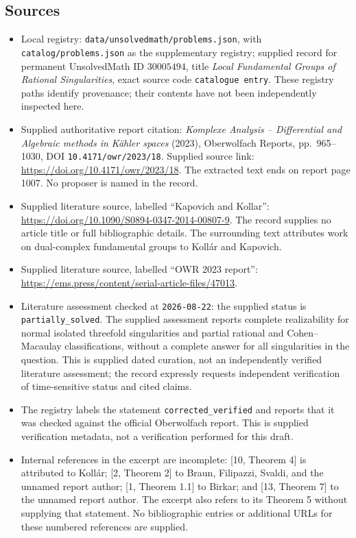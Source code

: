 \documentclass[11pt]{article}
\begin{document}
\subsection{Sources}
\begin{itemize}
\item Local registry: \texttt{data/unsolvedmath/problems.json}, with \texttt{catalog/problems.json} as the supplementary registry; supplied record for permanent UnsolvedMath ID \(30005494\), title \emph{Local Fundamental Groups of Rational Singularities}, exact source code \texttt{catalogue entry}. These registry paths identify provenance; their contents have not been independently inspected here.
\item Supplied authoritative report citation: \emph{Komplexe Analysis -- Differential and Algebraic methods in Kähler spaces} (2023), Oberwolfach Reports, pp.\ 965--1030, DOI \texttt{10.4171/owr/2023/18}. Supplied source link: \url{https://doi.org/10.4171/owr/2023/18}. The extracted text ends on report page 1007. No proposer is named in the record.
\item Supplied literature source, labelled ``Kapovich and Kollar'': \url{https://doi.org/10.1090/S0894-0347-2014-00807-9}. The record supplies no article title or full bibliographic details. The surrounding text attributes work on dual-complex fundamental groups to Koll\'ar and Kapovich.
\item Supplied literature source, labelled ``OWR 2023 report'': \url{https://ems.press/content/serial-article-files/47013}.
\item Literature assessment checked at \texttt{2026-08-22}: the supplied status is \texttt{partially\_solved}. The supplied assessment reports complete realizability for normal isolated threefold singularities and partial rational and Cohen--Macaulay classifications, without a complete answer for all singularities in the question. This is supplied dated curation, not an independently verified literature assessment; the record expressly requests independent verification of time-sensitive status and cited claims.
\item The registry labels the statement \texttt{corrected\_verified} and reports that it was checked against the official Oberwolfach report. This is supplied verification metadata, not a verification performed for this draft.
\item Internal references in the excerpt are incomplete: [10, Theorem 4] is attributed to Koll\'ar; [2, Theorem 2] to Braun, Filipazzi, Svaldi, and the unnamed report author; [1, Theorem 1.1] to Birkar; and [13, Theorem 7] to the unnamed report author. The excerpt also refers to its Theorem 5 without supplying that statement. No bibliographic entries or additional URLs for these numbered references are supplied.
\end{itemize}
\end{document}

